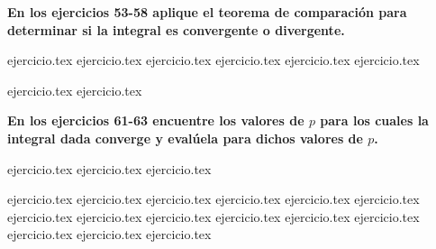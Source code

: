 \vspace{0.5cm}
\noindent\textbf{En los ejercicios 53-58 aplique el teorema de comparación para determinar si la integral es convergente o divergente.}
\begin{enumerate}
    \setcounter{enumi}{52}
    {ejercicio.tex}
{ejercicio.tex}
{ejercicio.tex}
{ejercicio.tex}
{ejercicio.tex}
{ejercicio.tex}
\end{enumerate}

\vspace{0.5cm}
\begin{enumerate}
    \setcounter{enumi}{58}
    {ejercicio.tex}
{ejercicio.tex}
\end{enumerate}

\vspace{0.5cm}
\noindent\textbf{En los ejercicios 61-63 encuentre los valores de $p$ para los cuales la integral dada converge y evalúela para dichos valores de $p$.}
\begin{enumerate}
    \setcounter{enumi}{60}
    {ejercicio.tex}
{ejercicio.tex}
{ejercicio.tex}
\end{enumerate}

\vspace{0.5cm}
\begin{enumerate}
    \setcounter{enumi}{63}
    {ejercicio.tex}
{ejercicio.tex}
{ejercicio.tex}
{ejercicio.tex}
{ejercicio.tex}
{ejercicio.tex}
{ejercicio.tex}
{ejercicio.tex}
{ejercicio.tex}
{ejercicio.tex}
{ejercicio.tex}
{ejercicio.tex}
{ejercicio.tex}
{ejercicio.tex}
{ejercicio.tex}
\end{enumerate}
